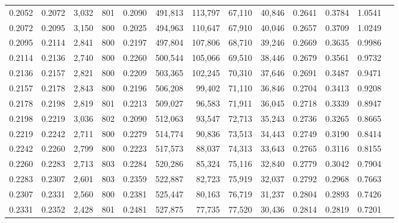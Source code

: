 \begin{tabular}{rrrrrrrrrrrrr}
0.2052 & 0.2072 &  3,032 & 801 &                                     0.2090 & 491,813 & 113,797 &  67,110 &  40,846 & 0.2641 & 0.3784 & 1.0541 \\
0.2072 & 0.2095 &  3,150 & 800 &                                     0.2025 & 494,963 & 110,647 &  67,910 &  40,046 & 0.2657 & 0.3709 & 1.0249 \\
0.2095 & 0.2114 &  2,841 & 800 &                                     0.2197 & 497,804 & 107,806 &  68,710 &  39,246 & 0.2669 & 0.3635 & 0.9986 \\
0.2114 & 0.2136 &  2,740 & 800 &                                     0.2260 & 500,544 & 105,066 &  69,510 &  38,446 & 0.2679 & 0.3561 & 0.9732 \\
0.2136 & 0.2157 &  2,821 & 800 &                                     0.2209 & 503,365 & 102,245 &  70,310 &  37,646 & 0.2691 & 0.3487 & 0.9471 \\
0.2157 & 0.2178 &  2,843 & 800 &                                     0.2196 & 506,208 &  99,402 &  71,110 &  36,846 & 0.2704 & 0.3413 & 0.9208 \\
0.2178 & 0.2198 &  2,819 & 801 &                                     0.2213 & 509,027 &  96,583 &  71,911 &  36,045 & 0.2718 & 0.3339 & 0.8947 \\
0.2198 & 0.2219 &  3,036 & 802 &                                     0.2090 & 512,063 &  93,547 &  72,713 &  35,243 & 0.2736 & 0.3265 & 0.8665 \\
0.2219 & 0.2242 &  2,711 & 800 &                                     0.2279 & 514,774 &  90,836 &  73,513 &  34,443 & 0.2749 & 0.3190 & 0.8414 \\
0.2242 & 0.2260 &  2,799 & 800 &                                     0.2223 & 517,573 &  88,037 &  74,313 &  33,643 & 0.2765 & 0.3116 & 0.8155 \\
0.2260 & 0.2283 &  2,713 & 803 &                                     0.2284 & 520,286 &  85,324 &  75,116 &  32,840 & 0.2779 & 0.3042 & 0.7904 \\
0.2283 & 0.2307 &  2,601 & 803 &                                     0.2359 & 522,887 &  82,723 &  75,919 &  32,037 & 0.2792 & 0.2968 & 0.7663 \\
0.2307 & 0.2331 &  2,560 & 800 &                                     0.2381 & 525,447 &  80,163 &  76,719 &  31,237 & 0.2804 & 0.2893 & 0.7426 \\
0.2331 & 0.2352 &  2,428 & 801 &                                     0.2481 & 527,875 &  77,735 &  77,520 &  30,436 & 0.2814 & 0.2819 & 0.7201 \\

\end{tabular}
